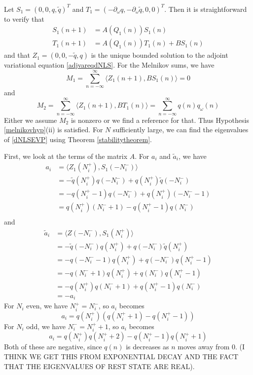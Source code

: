 \documentclass[12pt]{article}
\begin{document}
Let $S_1 = (0, 0, q, \tilde{q})^T$ and $T_1 = (-\partial_\omega q, -\partial_\omega \tilde{q}, 0, 0)^T$. Then it is straightforward to verify that
\begin{align*}
S_1(n+1) &= A(Q_1(n)) S_1(n) \\
T_1(n+1) &= A(Q_1(n)) T_1(n) + B S_1(n)
\end{align*}
and that $Z_1 = (0, 0, -\tilde{q}, q)$ is the unique bounded solution to the adjoint variational equation \eqref{adjvareqdNLS}. For the Melnikov sums, we have
\[
M_1 = \sum_{n=-\infty}^\infty \langle Z_1(n+1), B S_1(n) \rangle = 0
\]
and
\[
M_2 = \sum_{n=-\infty}^\infty \langle Z_1(n+1), B T_1(n) \rangle =
\sum_{n=-\infty}^\infty q(n) q_\omega(n)
\]
Either we assume $M_2$ is nonzero or we find a reference for that. Thus Hypothesis \ref{melnikovhyp}(ii) is satisfied. For $N$ sufficiently large, we can find the eigenvalues of \eqref{dNLSEVP} using Theorem \ref{stabilitytheorem}. 

First, we look at the terms of the matrix $A$. For $a_i$ and $\tilde{a}_i$, we have
\begin{align*}
a_i &= \langle Z_1(N_i^+), S_1(-N_i^-) \rangle \\
&= -\tilde{q}(N_i^+)q(-N_i^-) + q(N_i^+)\tilde{q}(-N_i^-) \\
&= -q(N_i^+ - 1)q(-N_i^-) + q(N_i^+)(-N_i^- - 1) \\
&= q(N_i^+)(N_i^- + 1) - q(N_i^+ - 1)q(N_i^-)\\
\end{align*}
and
\begin{align*}
\tilde{a}_i &= \langle Z(-N_i^-), S_1(N_i^+) \rangle \\
&= -\tilde{q}(-N_i^-)q(N_i^+) + q(-N_i^-)\tilde{q}(N_i^+) \\
&= -q(-N_i^- - 1)q(N_i^+) + q(-N_i^-)q(N_i^+ - 1) \\
&= -q(N_i^- + 1)q(N_i^+) + q(N_i^-)q(N_i^+ - 1) \\
&= -q(N_i^+)q(N_i^- + 1) + q(N_i^+ - 1)q(N_i^-) \\
&= -a_i
\end{align*}
For $N_i$ even, we have $N_i^+ = N_i^-$, so $a_i$ becomes
\[
a_i = q(N_i^+)( q(N_i^+ + 1) - q(N_i^+ - 1) )
\]
For $N_i$ odd, we have $N_i^- = N_i^+ + 1$, so $a_i$ becomes
\[
a_i = q(N_i^+)q(N_i^+ + 2) - q(N_i^+ - 1)q(N_i^+ + 1)
\]
Both of these are negative, since $q(n)$ is decreases as $n$ moves away from 0. (I THINK WE GET THIS FROM EXPONENTIAL DECAY AND THE FACT THAT THE EIGENVALUES OF REST STATE ARE REAL).
\end{document}
